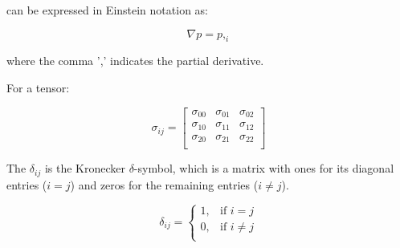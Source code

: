 can be expressed in Einstein notation as:

\begin{equation}
\nabla p = p,_{i}
\label{NOTATION5}
\end{equation}

where the comma ',' indicates the partial derivative.

For a tensor:

\begin{equation}
\sigma _{ij}= 
\left[ \begin{array}{ccc}
\sigma_{00} & \sigma_{01} & \sigma_{02} \\
\sigma_{10} & \sigma_{11} & \sigma_{12} \\
\sigma_{20} & \sigma_{21} & \sigma_{22} \\
\end{array} \right]
\label{NOTATION6}
\end{equation}


The $\delta_{ij}$ is the Kronecker $\delta$-symbol, which is a matrix with ones for its diagonal entries ($i = j$) and zeros for the remaining entries ($i \neq j$).

\begin{equation}
\delta _{ij} = 
\left \{ \begin{array}{cc}
1, & \mbox{if $i = j$} \\
0, & \mbox{if $i \neq j$} \\
\end{array}
\right.
\label{KRONECKER}
\end{equation}
